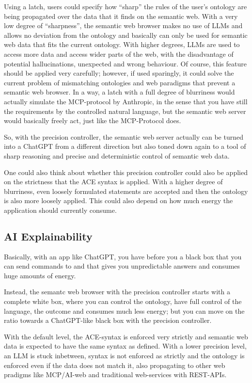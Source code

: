 \documentclass[12pt,a4paper]{article}
\begin{document}
Using a latch, users could specify how ``sharp'' the rules of the user's ontology are being propagated over the data that it finds on the semantic web. With a very low degree of ``sharpness'', the semantic web browser makes no use of LLMs and allows no deviation from the ontology and basically can only be used for semantic web data that fits the current ontology. With higher degrees, LLMs are used to access more data and access wider parts of the web, with the disadvantage of potential hallucinations, unexpected and wrong behaviour. Of course, this feature should be applied very carefully; however, if used sparingly, it could solve the current problem of mismatching ontologies and web paradigms that prevent a semantic web browser. In a way, a latch with a full degree of blurriness would actually simulate the MCP-protocol by Anthropic, in the sense that you have still the requirements by the controlled natural language, but the semantic web server would basically freely act, just like the MCP-Protocol does.

So, with the precision controller, the semantic web server actually can be turned into a ChatGPT from a different direction but also toned down again to a tool of sharp reasoning and precise and deterministic control of semantic web data.

One could also think about whether this precision controller could also be applied on the strictness that the ACE syntax is applied. With a higher degree of blurriness, even loosely formulated statements are accepted and then the ontology is also more loosely applied. This could also depend on how much energy the application should currently consume.

\subsection{AI Explainability}

Basically, with an app like ChatGPT, you have before you a black box that you can send commands to and that gives you unpredictable answers and consumes huge amounts of energy.

Instead, the semantc web browser with the precision controller starts with a complete white box, where you can control the ontology, have full control of the language, the outcome and consumes much less energy; but you can move on the ratio towards a ChatGPT-like black box with the precision controller.

With the default level, the ACE-syntax is enforced very strictly and semantic web data is expected to have the same syntax as defined. With a lower precision level, an LLM is stuck inbetween, syntax is not enforced as strictly and the ontology is enforced even if the data does not match it, also propagating to other web pradigms like MCP/AI-web and traditional web-services with REST-APIs.
\end{document}
